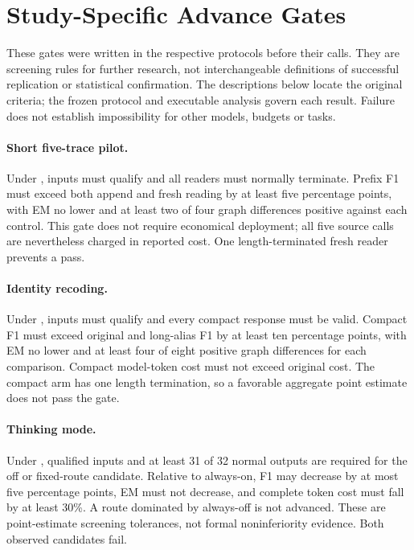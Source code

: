 \section{Study-Specific Advance Gates}
\label{app:gate-map}
These gates were written in the respective protocols before their calls. They are screening rules for further research, not interchangeable definitions of successful replication or statistical confirmation. The descriptions below locate the original criteria; the frozen protocol and executable analysis govern each result. Failure does not establish impossibility for other models, budgets or tasks.

\paragraph{Short five-trace pilot.} Under \protect{}, inputs must qualify and all readers must normally terminate. Prefix F1 must exceed both append and fresh reading by at least five percentage points, with EM no lower and at least two of four graph differences positive against each control. This gate does not require economical deployment; all five source calls are nevertheless charged in reported cost. One length-terminated fresh reader prevents a pass.

\paragraph{Identity recoding.} Under \protect{}, inputs must qualify and every compact response must be valid. Compact F1 must exceed original and long-alias F1 by at least ten percentage points, with EM no lower and at least four of eight positive graph differences for each comparison. Compact model-token cost must not exceed original cost. The compact arm has one length termination, so a favorable aggregate point estimate does not pass the gate.

\paragraph{Thinking mode.} Under \protect{}, qualified inputs and at least 31 of 32 normal outputs are required for the off or fixed-route candidate. Relative to always-on, F1 may decrease by at most five percentage points, EM must not decrease, and complete token cost must fall by at least 30\%. A route dominated by always-off is not advanced. These are point-estimate screening tolerances, not formal noninferiority evidence. Both observed candidates fail.

